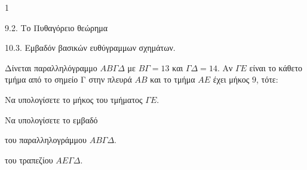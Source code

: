 \begin{ylh}{1}
    \item 9.2. Το Πυθαγόρειο θεώρημα
    \item 10.3. Εμβαδόν βασικών ευθύγραμμων σχημάτων.
\end{ylh}
Δίνεται παραλληλόγραμμο $ΑΒΓΔ$ με $ΒΓ=13$ και $ΓΔ=14$. Αν $ΓΕ$ είναι το κάθετο τμήμα από το σημείο Γ στην πλευρά $ΑΒ$ και το τμήμα $ΑΕ$ έχει μήκος $9$, τότε:
\begin{alist}
\item Να υπολογίσετε το μήκος του τμήματος $ΓΕ$. 
\item Να υπολογίσετε το εμβαδό
    \begin{rlist}
    \item του παραλληλογράμμου $ΑΒΓΔ$.
    \item του τραπεζίου $ΑΕΓΔ$.
    \end{rlist} 
\end{alist}